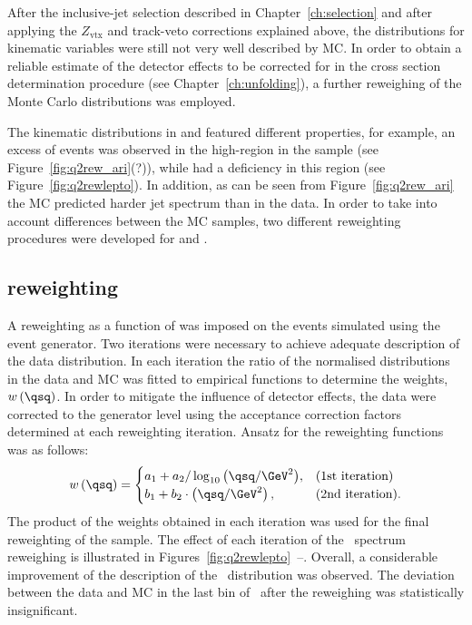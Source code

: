 After the inclusive-jet selection described in Chapter~\ref{ch:selection} and after applying the $Z_\text{vtx}$ and track-veto corrections explained above, the distributions for kinematic variables were still not very well described by MC. In order to obtain a reliable estimate of the detector effects to be corrected for in the cross section determination procedure (see Chapter~\ref{ch:unfolding}), a further reweighing of the Monte Carlo distributions was employed. 

The kinematic distributions in \lepto and \ariadne featured different properties, for example, an excess of events was observed in the high-\qsq region in the \ariadne sample (see Figure~\ref{fig:q2rew_ari}(?)), while \lepto had a deficiency in this region (see Figure~\ref{fig:q2rewlepto}). In addition, as can be seen from Figure~\ref{fig:q2rew_ari} the \ariadne MC predicted harder jet spectrum than in the data. In order to take into account differences between the MC samples, two different reweighting procedures were developed for \lepto and \ariadne.

\subsection{\lepto reweighting}
A reweighting as a function of \qsq was imposed on the events simulated using the \lepto event generator. Two iterations were necessary to achieve adequate description of the data distribution. In each iteration the ratio of the normalised \qsq distributions in the data and MC was fitted to empirical functions to determine the weights, $w\left( \qsq\right) $. In order to mitigate the influence of detector effects, the data were corrected to the generator level using the acceptance correction factors determined at each reweighting iteration. Ansatz for the reweighting functions was as follows:
\begin{equation}
w\left( \qsq\right) = 
\begin{cases}
a_1 + a_2 / \log_{10}{\left( \qsq/\GeV^2\right) }, & \text{(1st iteration)} \\
b_1 + b_2 \cdot \left( \qsq/\GeV^2\right) ,            & \text{(2nd iteration)}.
\end{cases}
\end{equation}
The product of the weights obtained in each iteration was used for the final reweighting of the \lepto sample. The effect of each iteration of the \qsq~spectrum reweighing is illustrated in Figures~\ref{fig:q2rewlepto}~--. Overall, a considerable improvement of the description of the \qsq~distribution was observed. The deviation between the data and MC in the last bin of \qsq~after the reweighing was statistically insignificant.


